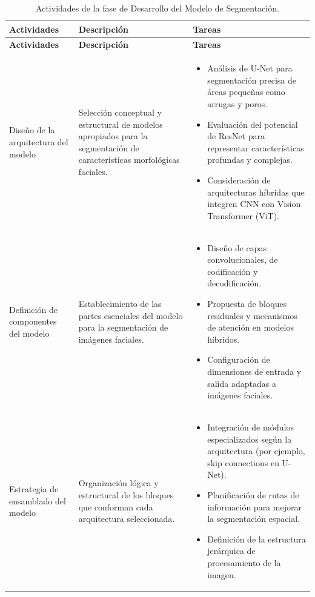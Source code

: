  \vspace{2ex}
 \begingroup
 \renewcommand\arraystretch{1.2}
 \begin{longtable}{p{4cm} p{6cm} p{6cm}}
 \caption{Actividades de la fase de Desarrollo del Modelo de Segmentación.}
 \label{tabla:actividades_segmentacion}\\
 \toprule
 \textbf{Actividades} & \textbf{Descripción} & \textbf{Tareas} \\
 \midrule
 \endfirsthead
 
 \toprule
 \textbf{Actividades} & \textbf{Descripción} & \textbf{Tareas} \\
 \midrule
 \endhead
 
 \bottomrule
 \endfoot
 
 Diseño de la arquitectura del modelo & Selección conceptual y estructural de modelos apropiados para la segmentación de características morfológicas faciales. &
 \begin{itemize}
     \item Análisis de U-Net para segmentación precisa de áreas pequeñas como arrugas y poros.
     \item Evaluación del potencial de ResNet para representar características profundas y complejas.
     \item Consideración de arquitecturas híbridas que integren CNN con Vision Transformer (ViT).
 \end{itemize} \\
 
 Definición de componentes del modelo & Establecimiento de las partes esenciales del modelo para la segmentación de imágenes faciales. &
 \begin{itemize}
     \item Diseño de capas convolucionales, de codificación y decodificación.
     \item Propuesta de bloques residuales y mecanismos de atención en modelos híbridos.
     \item Configuración de dimensiones de entrada y salida adaptadas a imágenes faciales.
 \end{itemize} \\
 
 Estrategia de ensamblado del modelo & Organización lógica y estructural de los bloques que conforman cada arquitectura seleccionada. &
 \begin{itemize}
     \item Integración de módulos especializados según la arquitectura (por ejemplo, skip connections en U-Net).
     \item Planificación de rutas de información para mejorar la segmentación espacial.
     \item Definición de la estructura jerárquica de procesamiento de la imagen.
 \end{itemize} \\
 
 \end{longtable}
 \endgroup

